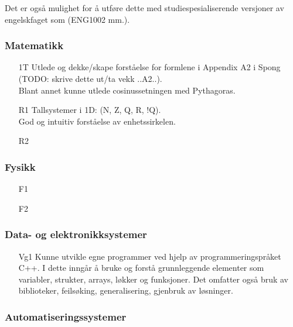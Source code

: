 		Det er også mulighet for å utføre dette med studiespesialiserende versjoner av engelskfaget som (ENG1002 mm.).


	\subsubsection*{Matematikk}

		\begin{itemize}

			\item[1T]  Utlede og dekke/skape forståelse for formlene i Appendix A2 i Spong (TODO: skrive dette ut/ta vekk ..A2..).\\
						Blant annet kunne utlede cosinussetningen med Pythagoras.
			\item[R1]  Tallsystemer i 1D: (N, Z, Q, R, !Q).\\
					   God og intuitiv forståelse av enhetssirkelen.
			\item[R2]

		\end{itemize}


	\subsubsection*{Fysikk}

		\begin{itemize}

			\item[F1]
			\item[F2]

		\end{itemize}

	\subsubsection*{Data- og elektronikksystemer}

		\begin{itemize}

			\item[Vg1] Kunne utvikle egne programmer ved hjelp av programmeringspråket C++. I dette inngår å bruke og forstå grunnleggende elementer som variabler, strukter, arrays, løkker og funksjoner. Det omfatter også bruk av biblioteker, feilsøking, generalisering, gjenbruk av løsninger.

		\end{itemize}


	\subsubsection*{Automatiseringssystemer}

